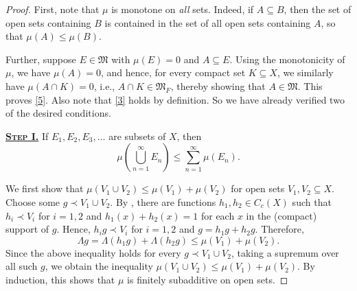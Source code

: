 \documentclass[11pt]{article}
\theoremstyle{thmstyle}
\theoremstyle{defstyle}
\newcommand{\frakM}{\mathfrak{M}} %
\renewcommand{\le}{\leqslant}
\begin{document}
\begin{proof}
    First, note that $\mu$ is monotone on \emph{all} sets. Indeed, if $A\subseteq B$, then the set of open sets containing $B$ is contained in the set of all open sets containing $A$, so that $\mu(A)\le\mu(B)$. 
    
    Further, suppose $E\in\frakM$ with $\mu(E) = 0$ and $A\subseteq E$. Using the monotonicity of $\mu$, we have $\mu(A) = 0$, and hence, for every compact set $K\subseteq X$, we similarly have $\mu(A\cap K) = 0$, i.e., $A\cap K\in\frakM_F$, thereby showing that $A\in\frakM$. This proves \ref{5}. Also note that \ref{3} holds by definition. So we have already verified two of the desired conditions.

    \vspace{0.5cm}

    \noindent\underline{\textbf{\textsc{Step I.}}} If $E_1, E_2, E_3,\dots$ are subsets of $X$, then 
    \begin{equation}\label{countable-subadditivity}\tag{$\spadesuit$}
        \mu\left(\bigcup_{n = 1}^\infty E_n\right) \le \sum_{n = 1}^\infty\mu(E_n).
    \end{equation}

    We first show that $\mu(V_1\cup V_2)\le \mu(V_1) + \mu(V_2)$ for open sets $V_1, V_2\subseteq X$. Choose some $g\prec V_1\cup V_2$. By , there are functions $h_1, h_2\in C_c(X)$ such that $h_i\prec V_i$ for $i = 1, 2$ and $h_1(x) + h_2(x) = 1$ for each $x$ in the (compact) support of $g$. Hence, $h_i g\prec V_i$ for $i = 1, 2$ and $g = h_1g + h_2 g$. Therefore, 
    \begin{equation*}
        \Lambda g = \Lambda(h_1 g) + \Lambda(h_2 g)\le \mu(V_1) + \mu(V_2).
    \end{equation*}
    Since the above inequality holds for every $g\prec V_1\cup V_2$, taking a supremum over all such $g$, we obtain the inequality $\mu(V_1\cup V_2)\le \mu(V_1) + \mu(V_2)$. By induction, this shows that $\mu$ is finitely subadditive on open sets.


\end{proof}
\end{document}
